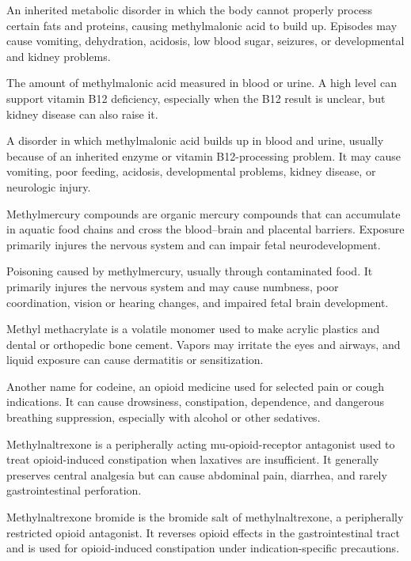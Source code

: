 An inherited metabolic disorder in which the body cannot properly process certain fats and proteins, causing methylmalonic acid to build up. Episodes may cause vomiting, dehydration, acidosis, low blood sugar, seizures, or developmental and kidney problems.

 The amount of methylmalonic acid measured in blood or urine. A high level can support vitamin B12 deficiency, especially when the B12 result is unclear, but kidney disease can also raise it.

 A disorder in which methylmalonic acid builds up in blood and urine, usually because of an inherited enzyme or vitamin B12-processing problem. It may cause vomiting, poor feeding, acidosis, developmental problems, kidney disease, or neurologic injury.

 Methylmercury compounds are organic mercury compounds that can accumulate in aquatic food chains and cross the blood--brain and placental barriers. Exposure primarily injures the nervous system and can impair fetal neurodevelopment.

 Poisoning caused by methylmercury, usually through contaminated food. It primarily injures the nervous system and may cause numbness, poor coordination, vision or hearing changes, and impaired fetal brain development.

 Methyl methacrylate is a volatile monomer used to make acrylic plastics and dental or orthopedic bone cement. Vapors may irritate the eyes and airways, and liquid exposure can cause dermatitis or sensitization.

 Another name for codeine, an opioid medicine used for selected pain or cough indications. It can cause drowsiness, constipation, dependence, and dangerous breathing suppression, especially with alcohol or other sedatives.

 Methylnaltrexone is a peripherally acting mu-opioid-receptor antagonist used to treat opioid-induced constipation when laxatives are insufficient. It generally preserves central analgesia but can cause abdominal pain, diarrhea, and rarely gastrointestinal perforation.

 Methylnaltrexone bromide is the bromide salt of methylnaltrexone, a peripherally restricted opioid antagonist. It reverses opioid effects in the gastrointestinal tract and is used for opioid-induced constipation under indication-specific precautions.

